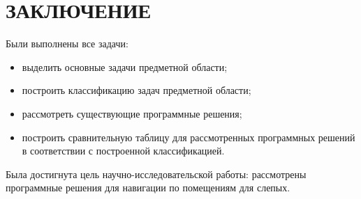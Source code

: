 \chapter*{\centering ЗАКЛЮЧЕНИЕ}

Были выполнены все задачи:
\begin{itemize}
	\item выделить основные задачи предметной области;
	\item построить классификацию задач предметной области;
	\item рассмотреть существующие программные решения;
	\item построить сравнительную таблицу для рассмотренных программных решений в соответствии с построенной классификацией.
\end{itemize}

Была достигнута цель научно-исследовательской работы: рассмотрены программные решения для навигации по помещениям для слепых.%
\clearpage
